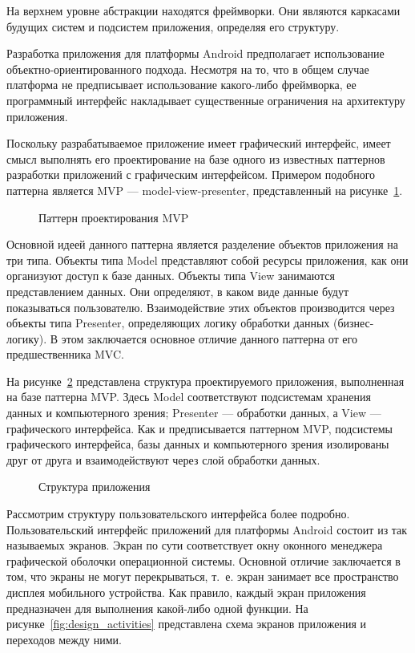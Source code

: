 На верхнем уровне абстракции находятся фреймворки.
Они являются каркасами будущих систем и подсистем приложения, определяя его структуру.

Разработка приложения для платформы Android предполагает использование
объектно-ориентированного подхода. Несмотря на то, что в общем случае
платформа не предписывает использование какого-либо фреймворка,
ее программный интерфейс накладывает существенные ограничения на
архитектуру приложения.

Поскольку разрабатываемое приложение имеет графический интерфейс,
имеет смысл выполнять его проектирование на базе одного из известных паттернов
разработки приложений с графическим интерфейсом. Примером подобного паттерна
является MVP --- model-view-presenter, представленный на
рисунке~\ref{fig:design_mvp}.

\begin{figure}[h!]
  \centering
  \caption{Паттерн проектирования MVP}
  \label{fig:design_mvp}
\end{figure}

Основной идеей данного паттерна является разделение объектов приложения на три типа.
Объекты типа Model представляют собой ресурсы приложения, как они организуют доступ
к базе данных. Объекты типа View занимаются представлением данных. Они определяют,
в каком виде данные будут показываться пользователю. Взаимодействие этих объектов
производится через объекты типа Presenter, определяющих логику
обработки данных (бизнес-логику). В этом заключается основное отличие данного паттерна от
его предшественника MVC.

На рисунке~\ref{fig:design_main} представлена структура проектируемого приложения,
выполненная на базе паттерна MVP.
Здесь Model соответствуют подсистемам хранения данных и компьютерного зрения;
Presenter --- обработки данных, а View --- графического интерфейса.
Как и предписывается паттерном MVP, подсистемы графического интерфейса,
базы данных и компьютерного зрения изолированы друг от друга и взаимодействуют
через слой обработки данных.

\begin{figure}[h!]
  \centering
  \caption{Структура приложения}
  \label{fig:design_main}
\end{figure}

Рассмотрим структуру пользовательского интерфейса более подробно.
Пользовательский интерфейс приложений для платформы Android состоит
из так называемых экранов.
Экран по сути соответствует окну оконного менеджера графической оболочки
операционной системы. Основной отличие заключается в том, что
экраны не могут перекрываться, т.~е. экран занимает все пространство дисплея
мобильного устройства.
Как правило, каждый экран приложения предназначен
для выполнения какой-либо одной функции.
На рисунке~\ref{fig:design_activities} представлена схема экранов приложения
и переходов между ними.

